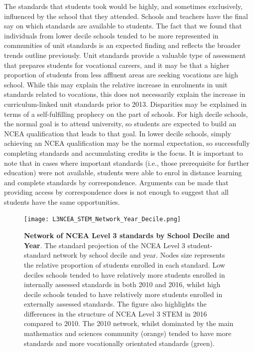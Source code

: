 The standards that students took would be highly, and sometimes exclusively, influenced by the school that they attended. Schools and teachers have the final say on which standards are available to students. The fact that we found that individuals from lower decile schools tended to be more represented in communities of unit standards is an expected finding and reflects the broader trends outline previously. Unit standards provide a valuable type of assessment that prepares students for vocational careers, and it may be that a higher proportion of students from less affluent areas are seeking vocations are high school. While this may explain the relative increase in enrolments in unit standards related to vocations, this does not necessarily explain the increase in curriculum-linked unit standards prior to 2013. Disparities may be explained in terms of a self-fulfilling prophecy on the part of schools. For high decile schools, the normal goal is to attend university, so students are expected to build an NCEA qualification that leads to that goal. In lower decile schools, simply achieving an NCEA qualification may be the normal expectation, so successfully completing standards and accumulating credits is the focus. It is important to note that in cases where important standards (i.e., those prerequisite for further education) were not available, students were able to enrol in distance learning and complete  standards by correspondence. Arguments can be made that providing access by correspondence does is not enough to suggest that all students have the same opportunities. 

\begin{landscape}
\begin{figure}[h]
    \centering
    \texttt{[image: L3NCEA\_STEM\_Network\_Year\_Decile.png]}
    \caption{\textbf{Network of NCEA Level 3 standards by School Decile and Year}. The standard projection of the NCEA Level 3 student-standard network by school decile and year. Nodes size represents the relative proportion of students enrolled in each standard. Low deciles schools tended to have relatively more students enrolled in internally assessed standards in both 2010 and 2016, whilst high decile schools tended to have relatively more students enrolled in externally assessed standards. The figure also highlights the differences in the structure of NCEA Level 3 STEM in 2016 compared to 2010. The 2010 network, whilst dominated by the main mathematics and sciences community (orange) tended to have more standards and more vocationally orientated standards (green).  
    }
    
    \label{fig:NetworkDecile}
\end{figure}
\end{landscape}

